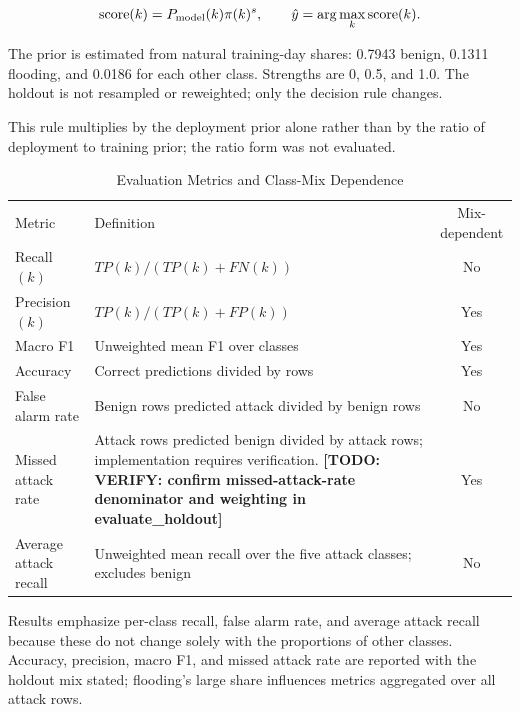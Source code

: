 \documentclass[conference]{IEEEtran}
\newcommand{\todo}[1]{\textbf{[TODO: #1]}}
\begin{document}
\begin{equation}\mathrm{score}(k)=P_{\rm model}(k)\pi(k)^s,\qquad \hat y=\arg\max_k\mathrm{score}(k).\end{equation}

The prior is estimated from natural training-day shares: 0.7943 benign, 0.1311 flooding, and 0.0186 for each other class. Strengths are 0, 0.5, and 1.0. The holdout is not resampled or reweighted; only the decision rule changes.

This rule multiplies by the deployment prior alone rather than by the ratio of deployment to training prior; the ratio form was not evaluated.

\begin{table}[t]\caption{Evaluation Metrics and Class-Mix Dependence}\label{tab:metrics}\centering\footnotesize

\begin{tabularx}{\textwidth}{l X c}\toprule Metric & Definition & Mix-dependent \\

Recall$(k)$ & $TP(k)/(TP(k)+FN(k))$ & No \\

Precision$(k)$ & $TP(k)/(TP(k)+FP(k))$ & Yes \\

Macro F1 & Unweighted mean F1 over classes & Yes \\

Accuracy & Correct predictions divided by rows & Yes \\

False alarm rate & Benign rows predicted attack divided by benign rows & No \\

Missed attack rate & Attack rows predicted benign divided by attack rows; implementation requires verification. \todo{VERIFY: confirm missed-attack-rate denominator and weighting in evaluate\_holdout} & Yes \\

Average attack recall & Unweighted mean recall over the five attack classes; excludes benign & No \\

\bottomrule\end{tabularx}\end{table}



Results emphasize per-class recall, false alarm rate, and average attack recall because these do not change solely with the proportions of other classes. Accuracy, precision, macro F1, and missed attack rate are reported with the holdout mix stated; flooding's large share influences metrics aggregated over all attack rows.
\end{document}
